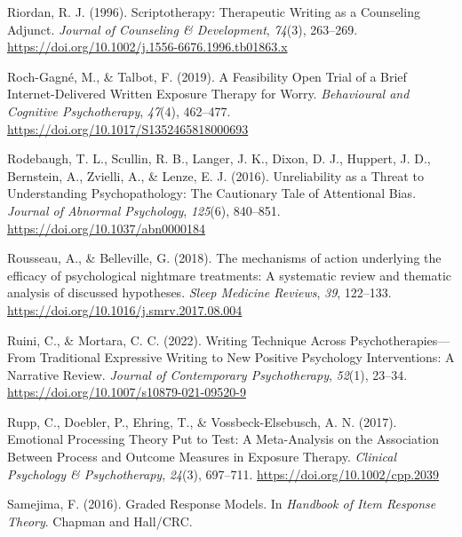 \documentclass[
  man,floatsintext]{apa7}
\newlength{\cslhangindent}
\newlength{\cslentryspacingunit} %
\newenvironment{CSLReferences}[2] %
 {%
  \setlength{\parindent}{0pt}
  \ifodd #1
  \let\oldpar\par
  \def\par{\hangindent=\cslhangindent\oldpar}
  \fi
  \setlength{\parskip}{#2\cslentryspacingunit}
 }%
 {}
\begin{document}
\begin{CSLReferences}{1}{0}
\leavevmode{}%
Riordan, R. J. (1996). Scriptotherapy: Therapeutic Writing as a Counseling Adjunct. \emph{Journal of Counseling \& Development}, \emph{74}(3), 263--269. \url{https://doi.org/10.1002/j.1556-6676.1996.tb01863.x}

\leavevmode{}%
Roch-Gagné, M., \& Talbot, F. (2019). A Feasibility Open Trial of a Brief Internet-Delivered Written Exposure Therapy for Worry. \emph{Behavioural and Cognitive Psychotherapy}, \emph{47}(4), 462--477. \url{https://doi.org/10.1017/S1352465818000693}

\leavevmode{}%
Rodebaugh, T. L., Scullin, R. B., Langer, J. K., Dixon, D. J., Huppert, J. D., Bernstein, A., Zvielli, A., \& Lenze, E. J. (2016). Unreliability as a Threat to Understanding Psychopathology: The Cautionary Tale of Attentional Bias. \emph{Journal of Abnormal Psychology}, \emph{125}(6), 840--851. \url{https://doi.org/10.1037/abn0000184}

\leavevmode{}%
Rousseau, A., \& Belleville, G. (2018). The mechanisms of action underlying the efficacy of psychological nightmare treatments: A systematic review and thematic analysis of discussed hypotheses. \emph{Sleep Medicine Reviews}, \emph{39}, 122--133. \url{https://doi.org/10.1016/j.smrv.2017.08.004}

\leavevmode{}%
Ruini, C., \& Mortara, C. C. (2022). Writing Technique Across Psychotherapies---From Traditional Expressive Writing to New Positive Psychology Interventions: A Narrative Review. \emph{Journal of Contemporary Psychotherapy}, \emph{52}(1), 23--34. \url{https://doi.org/10.1007/s10879-021-09520-9}

\leavevmode{}%
Rupp, C., Doebler, P., Ehring, T., \& Vossbeck-Elsebusch, A. N. (2017). Emotional Processing Theory Put to Test: A Meta-Analysis on the Association Between Process and Outcome Measures in Exposure Therapy. \emph{Clinical Psychology \& Psychotherapy}, \emph{24}(3), 697--711. \url{https://doi.org/10.1002/cpp.2039}

\leavevmode{}%
Samejima, F. (2016). Graded Response Models. In \emph{Handbook of Item Response Theory}. Chapman and Hall/CRC.


\end{CSLReferences}
\end{document}
